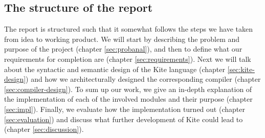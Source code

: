 \subsection{The structure of the report}
The report is structured such that it somewhat follows the steps we have taken from idea to working product. We will start by describing the problem and purpose of the project (chapter \ref{sec:probanal}), and then to define what our requirements for completion are (chapter \ref{sec:requirements}). Next we will talk about the syntactic and semantic design of the Kite language (chapter \ref{sec:kite-design}) and how we architecturally designed the corresponding compiler (chapter \ref{sec:compiler-design}). To sum up our work, we give an in-depth explanation of the implementation of each of the involved modules and their purpose (chapter \ref{sec:impl}). Finally, we evaluate how the implementation turned out (chapter \ref{sec:evaluation}) and discuss what further development of Kite could lead to (chapter \ref{sec:discussion}).

